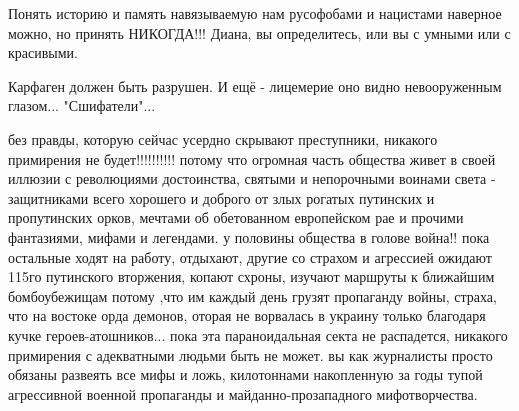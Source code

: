 \begin{itemize}
 

Понять историю и память навязываемую нам русофобами и нацистами наверное можно,
но принять НИКОГДА!!! Диана, вы определитесь, или вы с умными или с красивыми.


 
Карфаген должен быть разрушен. И ещё - лицемерие оно видно невооруженным глазом... "Сшифатели"...

 

без правды, которую сейчас усердно скрывают преступники, никакого примирения не
будет!!!!!!!!!! потому что огромная часть общества живет в своей иллюзии с
революциями достоинства, святыми и непорочными воинами света - защитниками
всего хорошего и доброго от злых рогатых путинских и пропутинских орков,
мечтами об обетованном европейском рае и прочими фантазиями, мифами и
легендами. у половины общества в голове война!! пока остальные ходят на работу,
отдыхают, другие со страхом и агрессией ожидают 115го путинского вторжения,
копают схроны, изучают маршруты к ближайшим бомбоубежищам потому ,что им каждый
день грузят пропаганду войны, страха, что на востоке орда демонов, оторая не
ворвалась в украину только благодаря кучке героев-атошников... пока эта
параноидальная секта не распадется, никакого примирения с адекватными людьми
быть не может. вы как журналисты просто обязаны развеять все мифы и ложь,
килотоннами накопленную за годы тупой агрессивной военной пропаганды и
майданно-прозападного мифотворчества.

\par


\end{itemize}
